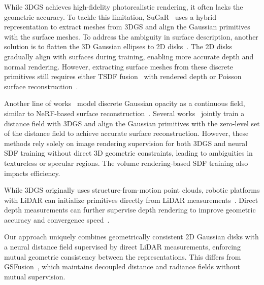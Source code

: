While 3DGS achieves high-fidelity photorealistic rendering, it often lacks the geometric accuracy. 
%
To tackle this limitation, SuGaR~\cite{guedon2024cvpr-sugar} uses a hybrid representation to extract meshes from 3DGS and align the Gaussian primitives with the surface meshes.
%
To address the ambiguity in surface description, another solution is to flatten the 3D Gaussian ellipses to 2D disks~\cite{huang2024siggraph-2dgs, dai2024siggraph-gaussian-surfels, zhang2024arxiv-radegs, jiang2024arxiv-ligs}.
%
The 2D disks gradually align with surfaces during training, enabling more accurate depth and normal rendering.
%
However, extracting surface meshes from these discrete primitives still requires either TSDF fusion~\cite{newcombe2011ismar} with rendered depth or Poisson surface reconstruction~\cite{kazhdan2013acmgraphics}. 
%

Another line of works~\cite{yu2024tog-gof, song2024neurips-gvkf} model discrete Gaussian opacity as a continuous field, similar to NeRF-based surface reconstruction~\cite{wang2021neurips}.
%
Several works~\cite{chen2023arxiv-neusg, lyu2024tog-3dgsr, yu2024neurips-gsdf} jointly train a distance field with 3DGS and align the Gaussian primitives with the zero-level set of the distance field to achieve accurate surface reconstruction.
%
However, these methods rely solely on image rendering supervision for both 3DGS and neural SDF training without direct 3D geometric constraints, leading to ambiguities in textureless or specular regions.
%
The volume rendering-based SDF training also impacts efficiency.
%

While 3DGS originally uses structure-from-motion point clouds, robotic platforms with LiDAR can initialize primitives directly from LiDAR measurements~\cite{cui2024tog-letsgo, hong2024ral-livgaussmap, xie2024arxiv-gslivm}.
%
Direct depth measurements can further supervise depth rendering to improve geometric accuracy and convergence speed~\cite{matsuki2024cvpr-monogs, jiang2024arxiv-ligs}.

%
%
%
Our approach uniquely combines geometrically consistent 2D Gaussian disks with a neural distance field supervised by direct LiDAR measurements, enforcing mutual geometric consistency between the representations.
%
This differs from GSFusion~\cite{wei2024ral-gsfusion}, which maintains decoupled distance and radiance fields without mutual supervision.
%

